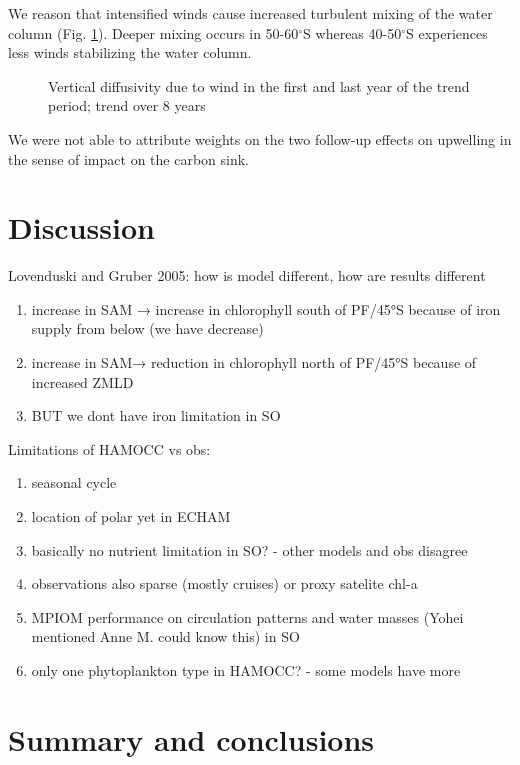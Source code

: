 \documentclass[12pt]{article}
\begin{document}
We reason that intensified winds cause increased turbulent mixing of the water column (Fig. \ref{fig:wind_mixing}). Deeper mixing occurs in 50-60$^\circ$S whereas 40-50$^\circ$S experiences less winds stabilizing the water column.

\begin{figure}
\label{fig:wind_mixing}
\caption{Vertical diffusivity due to wind in the first and last year of the trend period; trend over 8 years}
\end{figure}


We were not able to attribute weights on the two follow-up effects on upwelling in the sense of impact on the carbon sink.



\section{Discussion}
Lovenduski and Gruber 2005: how is model different, how are results different
\begin{enumerate}
\item increase in SAM → increase in chlorophyll south of PF/45°S because of iron supply from below (we have decrease)
\item increase in SAM→ reduction in chlorophyll north of PF/45°S because of increased ZMLD
\item BUT we dont have iron limitation in SO
\end{enumerate} 

Limitations of HAMOCC vs obs:
\begin{enumerate}
\item seasonal cycle \cite{Nevison2016}
\item location of polar yet in ECHAM
\item basically no nutrient limitation in SO? - other models and obs disagree
\item observations also sparse (mostly cruises) or proxy satelite chl-a
\item MPIOM performance on circulation patterns and water masses (Yohei mentioned Anne M. could know this) in SO
\item only one phytoplankton type in HAMOCC? - some models have more
\end{enumerate} 



\section{Summary and conclusions}
\end{document}
